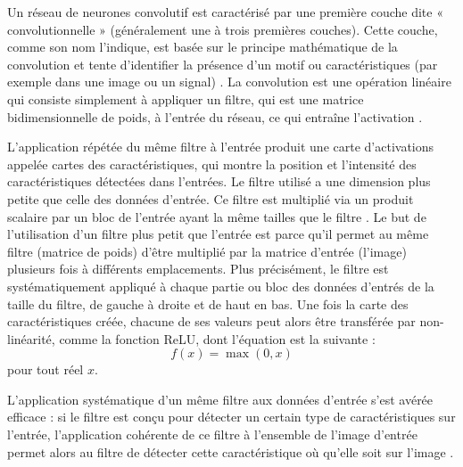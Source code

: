 Un réseau de neurones convolutif est caractérisé par une première couche dite « convolutionnelle » (généralement une à trois premières couches). Cette couche, comme son nom l’indique, est basée sur le principe mathématique de la convolution et tente d’identifier la présence d’un motif ou caractéristiques (par exemple dans une image ou un signal) \cite{lee2018convolutional}.
La convolution est une opération linéaire qui consiste simplement à appliquer un filtre, qui est une matrice bidimensionnelle de poids, à l’entrée du réseau, ce qui entraîne l’activation \cite{lee2018convolutional}. \par
L’application répétée du même filtre à l’entrée produit une carte d’activations appelée cartes des caractéristiques, qui montre la position et l’intensité des caractéristiques détectées dans l’entrées. Le filtre utilisé a une dimension plus petite que celle des données d’entrée. Ce filtre est multiplié via un produit scalaire par un bloc de l’entrée ayant la même tailles que le filtre \cite{lopez2020convolutional}. Le but de l’utilisation d’un filtre plus petit que l’entrée est parce qu’il permet au même filtre (matrice de poids) d’être multiplié par la matrice d’entrée (l’image) plusieurs fois à différents emplacements. Plus précisément, le filtre est systématiquement appliqué à chaque partie ou bloc des données d’entrés de la taille du filtre, de gauche à droite et de haut en bas. Une fois la carte des caractéristiques créée, chacune de ses valeurs peut alors être transférée par non-linéarité, comme la fonction ReLU, dont l’équation est la suivante \cite{lopez2020convolutional}:
\begin{equation}
f(x) = \max(0, x)
\end{equation}
pour tout réel \( x \). \par
L’application systématique d’un même filtre aux données d’entrée s’est avérée efficace : si le filtre est conçu pour détecter un certain type de caractéristiques sur l’entrée, l’application cohérente de ce filtre à l’ensemble de l’image d’entrée permet alors au filtre de détecter cette caractéristique où qu’elle soit sur l’image \cite{lopez2020convolutional}.

